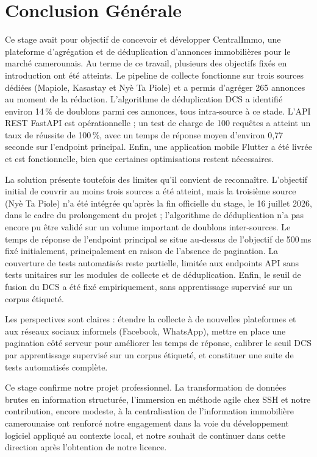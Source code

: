 
\chapter*{Conclusion Générale}

Ce stage avait pour objectif de concevoir et développer CentralImmo, une plateforme d'agrégation et de déduplication d'annonces immobilières pour le marché camerounais. Au terme de ce travail, plusieurs des objectifs fixés en introduction ont été atteints. Le pipeline de collecte fonctionne sur trois sources dédiées (Mapiole, Kasastay et Ny\`e Ta Piole) et a permis d'agréger 265 annonces au moment de la r\'edaction. L'algorithme de d\'eduplication DCS a identifi\'e environ 14\,\% de doublons parmi ces annonces, tous intra-source \`a ce stade. L'API REST FastAPI est op\'erationnelle ; un test de charge de 100 requ\^etes a atteint un taux de r\'eussite de 100\,\%, avec un temps de r\'eponse moyen d'environ 0{,}77 seconde sur l'endpoint principal. Enfin, une application mobile Flutter a \'et\'e livr\'ee et est fonctionnelle, bien que certaines optimisations restent n\'ecessaires.

La solution pr\'esente toutefois des limites qu'il convient de reconna\^itre. L'objectif initial de couvrir au moins trois sources a \'et\'e atteint, mais la troisi\`eme source (Ny\`e Ta Piole) n'a \'et\'e int\'egr\'ee qu'apr\`es la fin officielle du stage, le 16 juillet 2026, dans le cadre du prolongement du projet ; l'algorithme de d\'eduplication n'a pas encore pu \^etre valid\'e sur un volume important de doublons inter-sources. Le temps de r\'eponse de l'endpoint principal se situe au-dessus de l'objectif de 500\,ms fix\'e initialement, principalement en raison de l'absence de pagination. La couverture de tests automatis\'es reste partielle, limit\'ee aux endpoints API sans tests unitaires sur les modules de collecte et de d\'eduplication. Enfin, le seuil de fusion du DCS a \'et\'e fix\'e empiriquement, sans apprentissage supervis\'e sur un corpus \'etiquet\'e.

Les perspectives sont claires : étendre la collecte à de nouvelles plateformes et aux réseaux sociaux informels (Facebook, WhatsApp), mettre en place une pagination côté serveur pour améliorer les temps de réponse, calibrer le seuil DCS par apprentissage supervisé sur un corpus étiqueté, et constituer une suite de tests automatisés complète.

Ce stage confirme notre projet professionnel. La transformation de données brutes en information structurée, l'immersion en méthode agile chez SSH et notre contribution, encore modeste, à la centralisation de l'information immobilière camerounaise ont renforcé notre engagement dans la voie du développement logiciel appliqué au contexte local, et notre souhait de continuer dans cette direction après l'obtention de notre licence.
